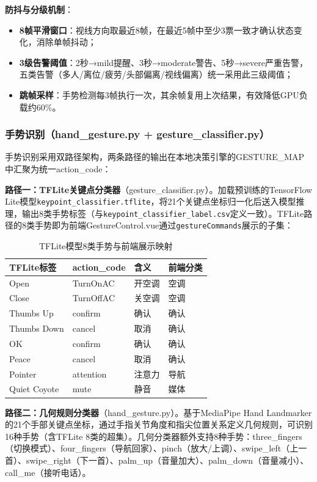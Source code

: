 \documentclass[a4paper]{article}
\begin{document}
\textbf{防抖与分级机制}：
\begin{itemize}
    \item \textbf{8帧平滑窗口}：视线方向取最近8帧，在最近5帧中至少3票一致才确认状态变化，消除单帧抖动；
    \item \textbf{3级告警阈值}：2秒→mild提醒、3秒→moderate警告、5秒→severe严重告警，五类告警（多人/离位/疲劳/头部偏离/视线偏离）统一采用此三级阈值；
    \item \textbf{跳帧采样}：手势检测每3帧执行一次，其余帧复用上次结果，有效降低GPU负载约60\%。
\end{itemize}

\subsubsection{手势识别（hand\_gesture.py + gesture\_classifier.py）}

手势识别采用双路径架构，两条路径的输出在本地决策引擎的GESTURE\_MAP中汇聚为统一action\_code：

\textbf{路径一：TFLite关键点分类器}（gesture\_classifier.py）。加载预训练的TensorFlow Lite模型\texttt{keypoint\_classifier.tflite}，将21个关键点坐标归一化后送入模型推理，输出8类手势标签（与\texttt{keypoint\_classifier\_label.csv}定义一致）。TFLite路径的8类手势即为前端GestureControl.vue通过\texttt{gestureCommands}展示的子集：

\begin{table}[H]
  \centering
  \caption{TFLite模型8类手势与前端展示映射}
  \label{tab:tflite_gestures}
  \begin{tabular}{llll}
  \toprule
  TFLite标签 & action\_code & 含义 & 前端分类 \\
  \midrule
  Open & TurnOnAC & 开空调 & 空调 \\
  Close & TurnOffAC & 关空调 & 空调 \\
  Thumbs Up & confirm & 确认 & 确认 \\
  Thumbs Down & cancel & 取消 & 确认 \\
  OK & confirm & 确认 & 确认 \\
  Peace & cancel & 取消 & 确认 \\
  Pointer & attention & 注意力 & 导航 \\
  Quiet Coyote & mute & 静音 & 媒体 \\
  \bottomrule
  \end{tabular}
\end{table}

\textbf{路径二：几何规则分类器}（hand\_gesture.py）。基于MediaPipe Hand Landmarker的21个手部关键点坐标，通过手指关节角度和指尖位置关系定义几何规则，可识别16种手势（含TFLite 8类的超集）。几何分类器额外支持8种手势：three\_fingers（切换模式）、four\_fingers（导航回家）、pinch（放大/上调）、swipe\_left（上一首）、swipe\_right（下一首）、palm\_up（音量加大）、palm\_down（音量减小）、call\_me（接听电话）。
\end{document}
